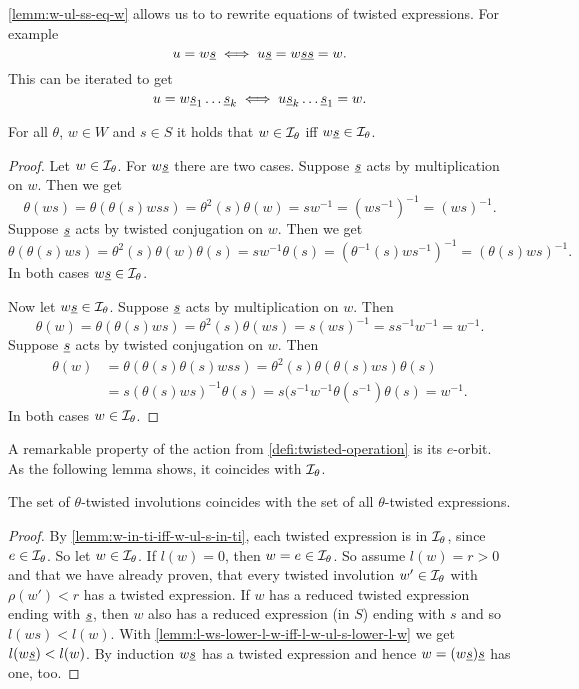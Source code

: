 \begin{rema}
	\ref{lemm:w-ul-ss-eq-w} allows us to to rewrite equations of twisted expressions. For example
	$$ u = w \underline{s} \iff u \underline{s} = w \underline{s} \underline{s} = w. $$
	This can be iterated to get
	$$ u = w \underline{s}_1 \ldots \underline{s}_k \iff u \underline{s}_k \ldots \underline{s}_1 = w. $$
\end{rema}

\begin{lemm}
	For all $\theta$, $w \in W$ and $s \in S$ it holds that $w \in \mathcal{I}_{\theta}$ iff $w \underline{s} \in \mathcal{I}_{\theta}$.

	\begin{proof}
		Let $w \in \mathcal{I}_{\theta}$. For $w \underline{s}$ there are two cases. Suppose $\underline{s}$ acts by multiplication on $w$. Then we get
		$$ \theta(ws) = \theta(\theta(s)wss) = \theta^2(s) \theta(w) = sw^{-1} = (ws^{-1})^{-1} = (ws)^{-1}. $$
		Suppose $\underline{s}$ acts by twisted conjugation on $w$. Then we get
		$$ \theta(\theta(s)ws) = \theta^2(s) \theta(w) \theta(s) = sw^{-1}\theta(s) = (\theta^{-1}(s)ws^{-1})^{-1} = (\theta(s)ws)^{-1}. $$
		In both cases $w \underline{s} \in \mathcal{I}_{\theta}$.

		Now let $w \underline{s} \in \mathcal{I}_{\theta}$. Suppose $\underline{s}$ acts by multiplication on $w$. Then
		$$ \theta(w) = \theta(\theta(s)ws) = \theta^2(s)\theta(ws) = s (ws)^{-1} = ss^{-1}w^{-1} = w^{-1}. $$
		Suppose $\underline{s}$ acts by twisted conjugation on $w$. Then
		\begin{align*}
			\theta(w)	& = \theta(\theta(s)\theta(s)wss) = \theta^2(s) \theta(\theta(s)ws) \theta(s) \\
						& = s (\theta(s)ws)^{-1} \theta(s) = s(s^{-1} w^{-1} \theta(s^{-1}) \theta(s) = w^{-1}.
		\end{align*}
		In both cases $w \in \mathcal{I}_{\theta}$.
	\end{proof}
\end{lemm}

A remarkable property of the action from \ref{defi:twisted-operation} is its $e$-orbit. As the following lemma shows, it coincides with $\mathcal{I}_{\theta}$.

\begin{lemm}
	The set of $\theta$-twisted involutions coincides with the set of all $\theta$-twisted expressions.

	\begin{proof}
		By \ref{lemm:w-in-ti-iff-w-ul-s-in-ti}, each twisted expression is in $\mathcal{I}_{\theta}$, since $e \in \mathcal{I}_{\theta}$. So let $w \in \mathcal{I}_{\theta}$. If $l(w) = 0$, then $w = e \in \mathcal{I}_{\theta}$. So assume $l(w) = r > 0$ and that we have already proven, that every twisted involution $w' \in \mathcal{I}_{\theta}$ with $\rho(w') < r$ has a twisted expression. If $w$ has a reduced twisted expression ending with $\underline{s}$, then $w$ also has a reduced expression (in $S$) ending with $s$ and so $l(ws) < l(w)$. With \ref{lemm:l-ws-lower-l-w-iff-l-w-ul-s-lower-l-w} we get $l(w \underline{s}) < l(w)$. By induction $w \underline{s}$ has a twisted expression and hence $w = (w \underline{s}) \underline{s}$ has one, too.
	\end{proof} 
\end{lemm}

